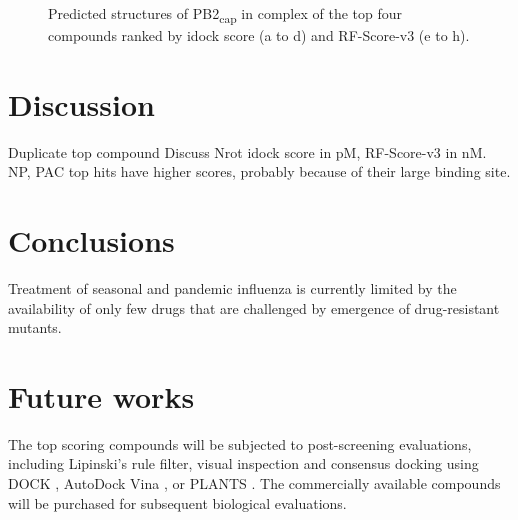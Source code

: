 \begin{figure}
\centering
{}
\\
\\
\\
\caption{Predicted structures of PB2\textsubscript{cap} in complex of the top four compounds ranked by idock score (a to d) and RF-Score-v3 (e to h).}
\label{influenza:2VQZ-Hits-4}
\end{figure}

\section{Discussion}

Duplicate top compound
Discuss Nrot
idock score in pM, RF-Score-v3 in nM.
NP, PAC top hits have higher scores, probably because of their large binding site.

\section{Conclusions}

Treatment of seasonal and pandemic influenza is currently limited by the availability of only few drugs that are challenged by emergence of drug-resistant mutants.

\section{Future works}

The top scoring compounds will be subjected to post-screening evaluations, including Lipinski's rule filter, visual inspection and consensus docking \citep{1590} using DOCK \citep{1222}, AutoDock Vina \citep{595}, or PLANTS \citep{610,607,779}. The commercially available compounds will be purchased for subsequent biological evaluations.

